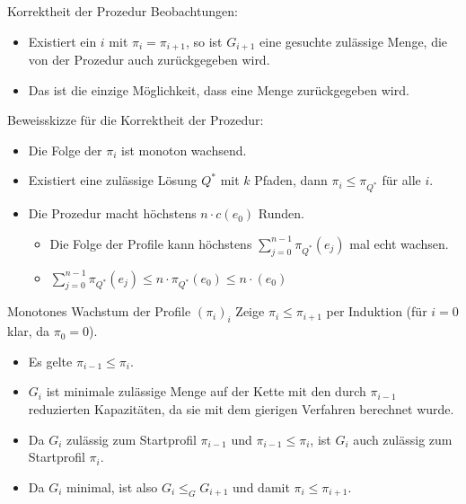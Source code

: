 \begin{frame}{Korrektheit der Prozedur}
	Beobachtungen:
	\begin{itemize}
		\pause\item Existiert ein $i$ mit $\pi_i = \pi_{i+1}$, so ist $G_{i+1}$ eine gesuchte zulässige Menge, die von der Prozedur auch zurückgegeben wird.
		\pause\item Das ist die einzige Möglichkeit, dass eine Menge zurückgegeben wird.
	\end{itemize}
	\pause Beweisskizze für die Korrektheit der Prozedur:
	\begin{itemize}
		\pause\item Die Folge der $\pi_i$ ist monoton wachsend.
		\pause\item Existiert eine zulässige Lösung $Q^*$ mit $k$ Pfaden, dann $\pi_i \leq \pi_{Q^*}$ für alle $i$.
		\pause\item Die Prozedur macht höchstens $n\cdot c(e_0)$ Runden.
		\begin{itemize}
			\pause\item Die Folge der Profile kann höchstens $\sum_{j=0}^{n-1}\pi_{Q^*}(e_j)$ mal echt wachsen.
			\pause\item $\sum_{j=0}^{n-1}\pi_{Q^*}(e_j)\leq n\cdot \pi_{Q^*}(e_0) \leq n\cdot(e_0)$
		\end{itemize}
	\end{itemize}
\end{frame}

\begin{frame}{Monotones Wachstum der Profile $(\pi_i)_i$}
	Zeige $\pi_i \leq \pi_{i+1}$ per Induktion (für $i=0$ klar, da $\pi_0 = 0$).
	\begin{itemize}
		\pause\item Es gelte $\pi_{i-1} \leq \pi_i$.
		\pause\item $G_i$ ist minimale zulässige Menge auf der Kette mit den durch $\pi_{i-1}$ reduzierten Kapazitäten, da sie mit dem gierigen Verfahren berechnet wurde.
		\pause\item Da $G_i$ zulässig zum Startprofil $\pi_{i-1}$ und $\pi_{i-1} \leq \pi_i$, ist $G_i$ auch zulässig zum Startprofil $\pi_i$.
		\pause\item Da $G_i$ minimal, ist also $G_i \leq_G G_{i+1}$ und damit $\pi_i \leq \pi_{i+1}$.
	\end{itemize}
\end{frame}

